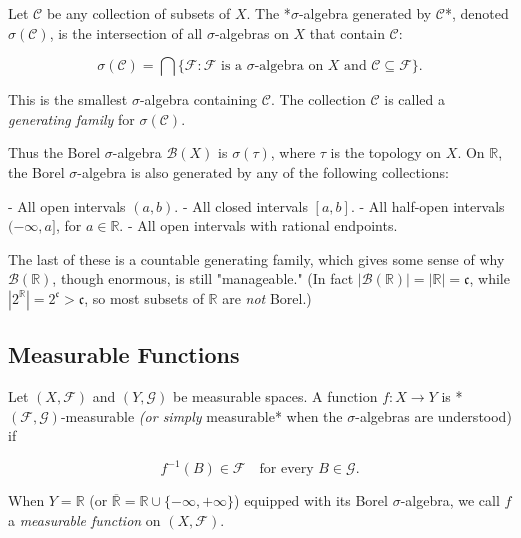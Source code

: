 \begin{definition}\label{def:7.5.}
Let $\mathcal{C}$ be any collection of subsets of $X$. The *$\sigma$-algebra generated by $\mathcal{C}$*, denoted $\sigma(\mathcal{C})$, is the intersection of all $\sigma$-algebras on $X$ that contain $\mathcal{C}$:

\[
\sigma(\mathcal{C}) = \bigcap \{ \mathcal{F} : \mathcal{F} \text{ is a } \sigma\text{-algebra on } X \text{ and } \mathcal{C} \subseteq \mathcal{F} \}.
\]

This is the smallest $\sigma$-algebra containing $\mathcal{C}$. The collection $\mathcal{C}$ is called a \textit{generating family} for $\sigma(\mathcal{C})$.

Thus the Borel $\sigma$-algebra $\mathcal{B}(X)$ is $\sigma(\tau)$, where $\tau$ is the topology on $X$. On $\mathbb{R}$, the Borel $\sigma$-algebra is also generated by any of the following collections:

- All open intervals $(a, b)$.
- All closed intervals $[a, b]$.
- All half-open intervals $(-\infty, a]$, for $a \in \mathbb{R}$.
- All open intervals with rational endpoints.

The last of these is a countable generating family, which gives some sense of why $\mathcal{B}(\mathbb{R})$, though enormous, is still "manageable." (In fact $|\mathcal{B}(\mathbb{R})| = |\mathbb{R}| = \mathfrak{c}$, while $|2^{\mathbb{R}}| = 2^{\mathfrak{c}} > \mathfrak{c}$, so most subsets of $\mathbb{R}$ are \textit{not} Borel.)
\end{definition}


\subsection{Measurable Functions}\label{sec:7.2.3}

\begin{definition}\label{def:7.6.}
Let $(X, \mathcal{F})$ and $(Y, \mathcal{G})$ be measurable spaces. A function $f: X \to Y$ is *$(\mathcal{F}, \mathcal{G})$-measurable\textit{ (or simply }measurable* when the $\sigma$-algebras are understood) if

\[
f^{-1}(B) \in \mathcal{F} \quad \text{for every } B \in \mathcal{G}.
\]

When $Y = \mathbb{R}$ (or $\overline{\mathbb{R}} = \mathbb{R} \cup \{-\infty, +\infty\}$) equipped with its Borel $\sigma$-algebra, we call $f$ a \textit{measurable function} on $(X, \mathcal{F})$.
\end{definition}


